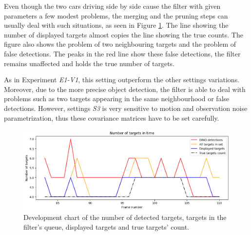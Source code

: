 Even though the two cars driving side by side cause the filter with given parameters a few modest problems, the merging
and
the pruning steps can usually deal with such situations, as seen in Figure \ref{gr:E1-V2-S3}. The line
showing
the number of displayed targets almost copies the line showing the true counts. The figure also shows the problem of
two neighbouring targets and the problem of false detections. The peaks in the red line show these false detections,
the filter remains unaffected and holds the true number of targets.


As in Experiment \textit{E1-V1}, this setting outperform the other settings variations. Moreover, due to the more
precise
object detection, the filter is able to deal with problems such as two targets appearing in the same neighbourhood or
false
detections. However, settings \textit{S3} is very sensitive to motion and observation noise parametrization, thus
these covariance matrices have to be set carefully.

\begin{figure}[H]
    \centering
    \includegraphics[width=\linewidth]{../../../experiments/E1/V2/DINO/dino_det}
    \caption{Development chart of the number of detected targets, targets in the filter's queue, displayed targets and
    true targets' count.}
    \label{gr:E1-V2-S3}
\end{figure}

